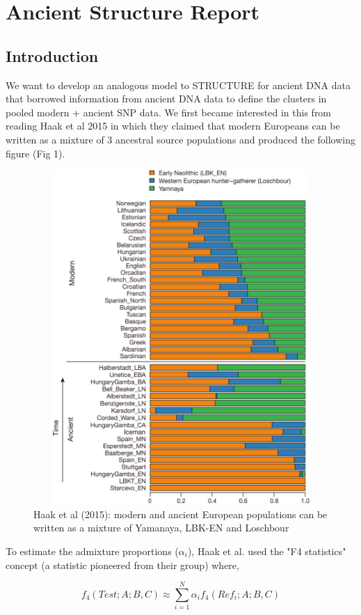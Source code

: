 
\section{Ancient Structure Report}

\subsection{Introduction}

We want  to develop an analogous model to STRUCTURE for ancient DNA data that borrowed information from ancient DNA data to define the clusters in pooled modern + ancient SNP data. We first became interested in this from reading Haak et al 2015 in which they claimed that modern Europeans can be written as a mixture of 3 ancestral source populations and produced the following figure (Fig 1).

\begin{figure}[ht]
\includegraphics[width=5in, height=5in]{../nature14317-f3.png}
\caption{Haak et al (2015): modern and ancient European populations can be written as a mixture of Yamanaya, LBK-EN and Loschbour}
\end{figure}

To estimate the admixture proportions ($\alpha_i$), Haak et al. used the "F4 statistics" concept (a statistic pioneered from their group) where,

$$f_4(Test; A; B, C) \approx \sum_{i=1}^N \alpha_i f_4(Ref_i; A; B,C)$$

